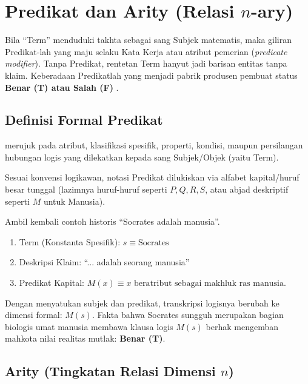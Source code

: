 \section{Predikat dan Arity (Relasi $n$-ary)}

Bila ``Term'' menduduki takhta sebagai sang Subjek matematis, maka giliran Predikat-lah yang maju selaku Kata Kerja atau atribut pemerian (\textit{predicate modifier}). Tanpa Predikat, rentetan Term hanyut jadi barisan entitas tanpa klaim. Keberadaan Predikatlah yang menjadi pabrik produsen pembuat status \textbf{Benar (T) atau Salah (F)} \cite{rosen2019}.

\subsection{Definisi Formal Predikat}

\begin{definisi}[Predikat]
 merujuk pada atribut, klasifikasi spesifik, properti, kondisi, maupun persilangan hubungan logis yang dilekatkan kepada sang Subjek/Objek (yaitu Term).
\end{definisi}

Sesuai konvensi logikawan, notasi Predikat dilukiskan via alfabet kapital/huruf besar tunggal (lazimnya huruf-huruf seperti $P, Q, R, S$, atau abjad deskriptif seperti $M$ untuk Manusia).

\begin{contoh}
Ambil kembali contoh historis ``Socrates adalah manusia''.
\begin{enumerate}
    \item Term (Konstanta Spesifik): $s \equiv \text{Socrates}$
    \item Deskripsi Klaim: ``... adalah seorang manusia''
    \item Predikat Kapital: $M(x) \equiv x \text{ beratribut sebagai makhluk ras manusia}$.
\end{enumerate}

Dengan menyatukan subjek dan predikat, transkripsi logisnya berubah ke dimensi formal: $M(s)$. Fakta bahwa Socrates sungguh merupakan bagian biologis umat manusia membawa klausa logis $M(s)$ berhak mengemban mahkota nilai realitas mutlak: \textbf{Benar (T)}.
\end{contoh}

\subsection{Arity (Tingkatan Relasi Dimensi $n$)}

